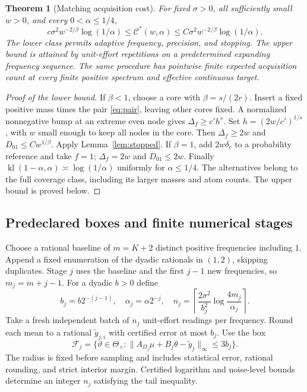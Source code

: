 \documentclass[10pt]{amsart}
\newtheorem{theorem}{Theorem}[section]
\theoremstyle{definition}
\theoremstyle{remark}
\theoremstyle{plain}
\newcommand{\ThetaAll}{\Theta_+}
\newcommand{\F}{\mathcal F}
\newcommand{\kl}{\operatorname{kl}}
\begin{document}
\begin{theorem}[Matching acquisition cost]\label{thm:cost}
For fixed $\sigma>0$, all sufficiently small $w>0$, and every $0<\alpha\le1/4$,
\begin{equation}\label{eq:cost}
 c\sigma^2w^{-2/\beta}\log(1/\alpha)
 \le\mathcal C^*(w,\alpha)
 \le C\sigma^2w^{-2/\beta}\log(1/\alpha).
\end{equation}
The lower class permits adaptive frequency, precision, and stopping. The upper bound is attained by unit-effort repetitions on a predetermined expanding frequency sequence. The same procedure has pointwise finite expected acquisition count at every finite positive spectrum and effective continuous target.
\end{theorem}
\begin{proof}[Proof of the lower bound]
If $\beta<1$, choose a core with $\beta=s/(2r)$. Insert a fixed positive mass times the pair \eqref{eq:pair}, leaving other cores fixed. A normalized nonnegative bump at an extreme even node gives $\Delta_f\ge c'h^s$. Set $h=(2w/c')^{1/s}$, with $w$ small enough to keep all nodes in the core. Then $\Delta_f\ge2w$ and $D_{01}\le Cw^{1/\beta}$. Apply Lemma~\ref{lem:stopped}. If $\beta=1$, add $2w\delta_c$ to a probability reference and take $f=1$; $\Delta_f=2w$ and $D_{01}\le2w$. Finally $\kl(1-\alpha,\alpha)\asymp\log(1/\alpha)$ uniformly for $\alpha\le1/4$. The alternatives belong to the full coverage class, including its larger masses and atom counts. The upper bound is proved below.
\end{proof}

\subsection{Predeclared boxes and finite numerical stages}
Choose a rational baseline of $m=K+2$ distinct positive frequencies including $1$. Append a fixed enumeration of the dyadic rationals in $(1,2)$, skipping duplicates. Stage $j$ uses the baseline and the first $j-1$ new frequencies, so $m_j=m+j-1$. For a dyadic $b>0$ define
\begin{equation}\label{eq:stages}
 b_j=b2^{-(j-1)},\quad \alpha_j=\alpha2^{-j},\quad
 n_j=\left\lceil\frac{2\sigma^2}{b_j^2}
                 \log\frac{4m_j}{\alpha_j}\right\rceil.
\end{equation}
Take a fresh independent batch of $n_j$ unit-effort readings per frequency. Round each mean to a rational $\widetilde y_{j,i}$ with certified error at most $b_j$. Use the box
\begin{equation}\label{eq:stagebox}
 \F_j=\{\vartheta\in\ThetaAll:
        \|A_{\Omega_j}\mu+B_j\theta-\widetilde y_j\|_\infty\le3b_j\}.
\end{equation}
The radius is fixed before sampling and includes statistical error, rational rounding, and strict interior margin. Certified logarithm and noise-level bounds determine an integer $n_j$ satisfying the tail inequality.
\end{document}

